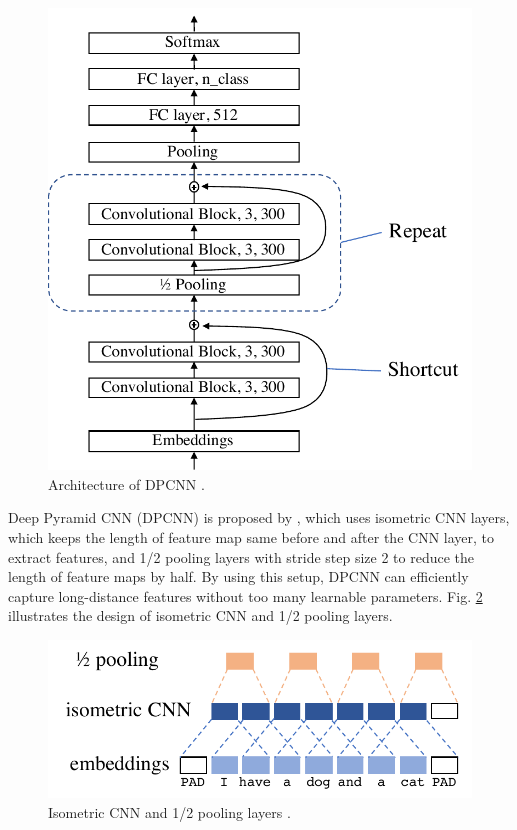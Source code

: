 \documentclass[11pt,letterpaper]{article}
\begin{document}
    \begin{figure}[htbp]
        \centering
        \includegraphics[width=\linewidth]{fig/3.pdf}  
        \caption{Architecture of DPCNN \cite{johnson2017deep}.} 
        \label{fig:DPCNN}
    \end{figure}

    Deep Pyramid CNN (DPCNN) is proposed by , which uses 
    isometric CNN layers, which keeps the length of feature map same before and 
    after the CNN layer, to extract features, and 1/2 pooling layers with stride 
    step size 2 to reduce the length of feature maps by half. By using this 
    setup, DPCNN can efficiently capture long-distance features without too many 
    learnable parameters. Fig. \ref{fig:ICNN} illustrates the design of 
    isometric CNN and 1/2 pooling layers. 

    \begin{figure}[htbp]
        \centering
        \includegraphics[width=\linewidth]{fig/2.pdf}  
        \caption{Isometric CNN and 1/2 pooling layers \cite{johnson2017deep}.} 
        \label{fig:ICNN}
    \end{figure}
\end{document}
